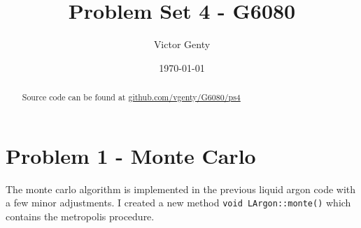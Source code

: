 \documentclass[singlepage,notitlepage,nofootinbib,11pt]{revtex4-1}
\begin{document}
\title{Problem Set 4 - G6080}
\author{Victor Genty}
\date{\today}
\begin{abstract}
\centering
Source code can be found at \href{https://github.com/vgenty/G6080/tree/master/ps3}{github.com/vgenty/G6080/ps4}
\end{abstract}
\maketitle
\section{Problem 1 - Monte Carlo}
The monte carlo algorithm is implemented in the previous liquid argon code with a few minor adjustments. I created a new method \verb|void LArgon::monte()| which contains the metropolis procedure.
\end{document}
